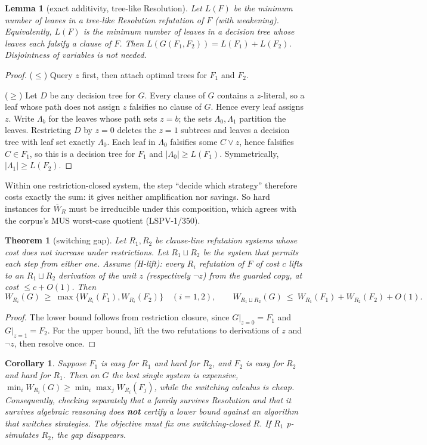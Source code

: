 \documentclass[11pt]{article}
\newtheorem{theorem}{Theorem}\newtheorem{lemma}{Lemma}\newtheorem{corollary}{Corollary}
\begin{document}
\begin{lemma}[exact additivity, tree-like Resolution]
Let $L(F)$ be the minimum number of leaves in a tree-like Resolution refutation of $F$ (with weakening). Equivalently, $L(F)$ is the minimum number of leaves in a decision tree whose leaves each falsify a clause of $F$. Then $L(G(F_1,F_2))=L(F_1)+L(F_2)$. Disjointness of variables is not needed.
\end{lemma}
\begin{proof}
($\le$) Query $z$ first, then attach optimal trees for $F_1$ and $F_2$.

($\ge$) Let $D$ be any decision tree for $G$. Every clause of $G$ contains a $z$-literal, so a leaf whose path does not assign $z$ falsifies no clause of $G$. Hence every leaf assigns $z$. Write $\Lambda_b$ for the leaves whose path sets $z=b$; the sets $\Lambda_0,\Lambda_1$ partition the leaves. Restricting $D$ by $z=0$ deletes the $z=1$ subtrees and leaves a decision tree with leaf set exactly $\Lambda_0$. Each leaf in $\Lambda_0$ falsifies some $C\vee z$, hence falsifies $C\in F_1$, so this is a decision tree for $F_1$ and $|\Lambda_0|\ge L(F_1)$. Symmetrically, $|\Lambda_1|\ge L(F_2)$.
\end{proof}
Within one restriction-closed system, the step ``decide which strategy'' therefore costs exactly the sum: it gives neither amplification nor savings. So hard instances for $\overline W_R$ must be irreducible under this composition, which agrees with the corpus's MUS worst-case quotient (LSPV-1/350).

\begin{theorem}[switching gap]
Let $R_1,R_2$ be clause-line refutation systems whose cost does not increase under restrictions. Let $R_1\sqcup R_2$ be the system that permits each step from either one. Assume (H-lift): every $R_i$ refutation of $F$ of cost $c$ lifts to an $R_1\sqcup R_2$ derivation of the unit $z$ (respectively $\neg z$) from the guarded copy, at cost $\le c+O(1)$. Then
\[
W_{R_i}(G)\ \ge\ \max\{W_{R_i}(F_1),W_{R_i}(F_2)\}\quad(i=1,2),\qquad
W_{R_1\sqcup R_2}(G)\ \le\ W_{R_1}(F_1)+W_{R_2}(F_2)+O(1).
\]
\end{theorem}
\begin{proof}
The lower bound follows from restriction closure, since $G|_{z=0}=F_1$ and $G|_{z=1}=F_2$. For the upper bound, lift the two refutations to derivations of $z$ and $\neg z$, then resolve once.
\end{proof}
\begin{corollary}
Suppose $F_1$ is easy for $R_1$ and hard for $R_2$, and $F_2$ is easy for $R_2$ and hard for $R_1$. Then on $G$ the best \emph{single} system is expensive, $\min_i W_{R_i}(G)\ge\min_i\max_j W_{R_i}(F_j)$, while the switching calculus is cheap. Consequently, checking separately that a family survives Resolution and that it survives algebraic reasoning does \textbf{not} certify a lower bound against an algorithm that switches strategies. The objective must fix one switching-closed $R$. If $R_1$ p-simulates $R_2$, the gap disappears.
\end{corollary}
\end{document}
